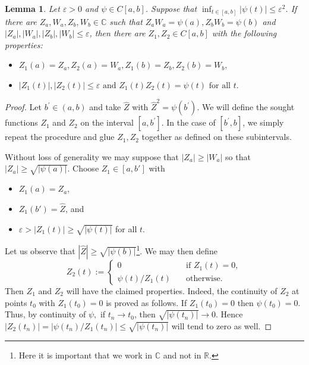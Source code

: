 \documentclass[12pt,fleqn]{amsart}
\newtheorem{lemma}[theorem]{Lemma}
\theoremstyle{definition}
\numberwithin{equation}{section}
\theoremstyle{remark}
\begin{document}
\begin{lemma}\label{l4.12}
    Let $\varepsilon > 0$ and $\psi\in C[a, b]$. Suppose that $\inf_{t \in[a, b]} |\psi(t)| \leqslant \varepsilon^{2}$. If there are $Z_{a}, W_{a}, Z_{b}, W_{b} \in \mathbb{C}$ such that $Z_{a} W_{a}=\psi(a), Z_{b} W_{b}=\psi(b)$ and $\left|Z_{a}\right|,\left|W_{a}\right|,\left|Z_{b}\right|,\left|W_{b}\right| \leqslant \varepsilon$, then there are  $Z_{1}, Z_{2}\in C[a, b]$ with the following properties:

    \begin{itemize}
    \item $Z_{1}(a)=Z_{a}, Z_{2}(a)=W_{a}, Z_{1}(b)=Z_{b}, Z_{2}(b)=W_{b},$ 
    \item $\left|Z_{1}(t)\right|,\left|Z_{2}(t)\right| \leqslant \varepsilon \text{ and } Z_{1}(t) Z_{2}(t)=\psi(t) \text{ for all } t.$
    \end{itemize}
\end{lemma}

\begin{proof}
    Let $b^{\prime} \in (a,b)$ and take $\hat{Z}$ with $\hat{Z}^{2}=\psi\left(b^{\prime}\right)$. We will define the sought functions $Z_{1}$ and $Z_{2}$ on the interval $\left[a, b^{\prime}\right]$. In the case of $\left[b^{\prime}, b\right]$, we simply repeat the procedure and glue $Z_{1}, Z_{2}$ together as defined on these subintervals.

    Without loss of generality we may suppose that $\left|Z_{a}\right| \geqslant \left|W_{a}\right|$ so that $\left|Z_{a}\right| \geqslant \sqrt{|\psi(a)|}$. Choose $Z_{1}\in [a, b']$ with 
    \begin{itemize}
        \item $Z_{1}(a)=Z_{a}$,
        \item $Z_{1}(b')=\hat{Z}$, and 
        \item $\varepsilon > \left|Z_{1}(t)\right| \geqslant \sqrt{|\psi(t)|}$ for all $t$.
    \end{itemize}
    Let us observe that $|\hat{Z}| \geqslant \sqrt{|\psi(b)|}$\footnote{Here it is important that we work in $\mathbb{C}$ and not in $\mathbb{R}$.}. We may then define
        \[   
            Z_{2}(t):= 
                 \begin{cases}
                   0 &\quad\text{if } Z_{1}(t)=0, \\
                   \psi(t) / Z_{1}(t)&\quad\text{otherwise} .
                 \end{cases}
        \]
    Then $Z_{1}$ and $Z_{2}$ will have the claimed properties. Indeed, the continuity of $Z_{2}$ at points $t_{0}$ with $Z_{1}\left(t_{0}\right)=0$ is proved as follows. If $Z_{1}\left(t_{0}\right)=0$ then $\psi\left(t_{0}\right)=0$. Thus, by continuity of $\psi,$ if $t_{n} \rightarrow t_{0}$, then $\sqrt{\left|\psi\left(t_{n}\right)\right|} \rightarrow 0.$ Hence $\left|Z_{2}\left(t_{n}\right)\right|=\left|\psi\left(t_{n}\right) / Z_{1}\left(t_{n}\right)\right| \leqslant \sqrt{\left|\psi\left(t_{n}\right)\right|}$ will tend to zero as well.
    
\end{proof}
\end{document}
